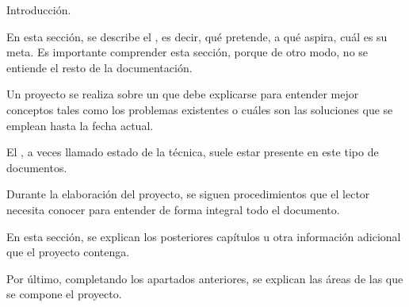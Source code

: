 \minitoc

\begin{sinopsis}
\label{sec:intro:sinop}
	Introducción.

\end{sinopsis}

\label{sec:intro:obj}
	En esta sección, se describe el , es decir, qué pretende, a qué aspira, cuál es su meta.\nli
	Es importante comprender esta sección, porque de otro modo, no se entiende el resto de la documentación.

	Un proyecto se realiza sobre un  que debe explicarse para entender mejor conceptos tales como los problemas existentes o cuáles son las soluciones que se emplean hasta la fecha actual.

	El , a veces llamado estado de la técnica, suele estar presente en este tipo de documentos.
  
	Durante la elaboración del proyecto, se siguen procedimientos que el lector necesita conocer para entender de forma integral todo el documento.

 En esta sección, se explican los posteriores capítulos u otra información adicional que el proyecto contenga.

	Por último, completando los apartados anteriores, se explican las áreas de las que se compone el proyecto.

\chapterend